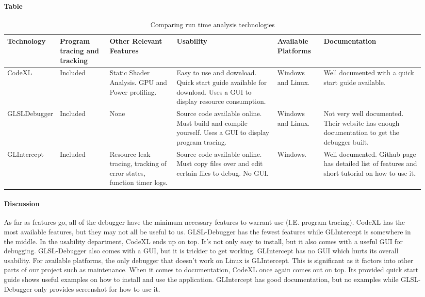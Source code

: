 \paragraph{Table}
\begin{center}
\begin{table}[H]
\begin{tabular}{ | m{7em} | m{7em} | m{7em} | m{7em} | m{7em} | m{7em} |  } 
\hline
\textbf{Technology}  & \textbf{Program tracing and tracking} & \textbf{Other Relevant Features} & \textbf{Usability} & \textbf{Available Platforms} & \textbf{Documentation} \\ \hline
CodeXL & Included  & Static Shader Analysis. GPU and Power profiling. & Easy to use and download. Quick start guide available for download.
Uses a GUI to display resource consumption. & Windows and Linux. & Well documented with a quick start guide available.  \\ \hline
GLSL\-Debugger & Included & None & Source code available online. Must build and compile yourself. Uses a GUI to display program tracing. & Windows and Linux. & Not very well documented. Their website has enough documentation to get the debugger built.  \\ \hline
GLIntercept & Included & Resource leak tracing, tracking of error states, function timer logs. & Source code available online. Must copy files over and edit certain files to debug. No GUI. & Windows. & Well documented. Github page has detailed list of features and short tutorial on how to use it. \\ \hline
\end{tabular}
\newline
\caption{Comparing run time analysis technologies}
\label{table:runtime}
\end{table}
\end{center}

\newpage

\paragraph{Discussion}
As far as features go, all of the debugger have the minimum necessary features to warrant use (I.E. program tracing).
CodeXL has the most available features, but they may not all be useful to us.
GLSL-Debugger has the fewest features while GLIntercept is somewhere in the middle.
In the usability department, CodeXL ends up on top.
It's not only easy to install, but it also comes with a useful GUI for debugging.
GLSL-Debugger also comes with a GUI, but it is trickier to get working.
GLIntercept has no GUI which hurts its overall usability.
For available platforms, the only debugger that doesn't work on Linux is GLIntercept.
This is significant as it factors into other parts of our project such as maintenance.
When it comes to documentation, CodeXL once again comes out on top.
Its provided quick start guide shows useful examples on how to install and use the application.
GLIntercept has good documentation, but no examples while GLSL-Debugger only provides screenshot for how to use it.


